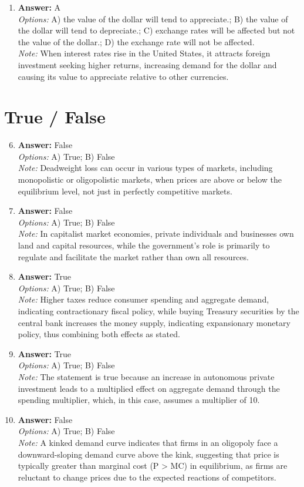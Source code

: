 \documentclass[12pt]{article}
\begin{document}
\begin{enumerate}[label=\arabic*.]
\item \textbf{Answer:} A
\\ \textit{Options:} A) the value of the dollar will tend to appreciate.; B) the value of the dollar will tend to depreciate.; C) exchange rates will be affected but not the value of the dollar.; D) the exchange rate will not be affected.
\\ \textit{Note:} When interest rates rise in the United States, it attracts foreign investment seeking higher returns, increasing demand for the dollar and causing its value to appreciate relative to other currencies.
\end{enumerate}

\section*{True / False}
\begin{enumerate}[label=\arabic*.]
\setcounter{enumi}{5}
\item \textbf{Answer:} False
\\ \textit{Options:} A) True; B) False
\\ \textit{Note:} Deadweight loss can occur in various types of markets, including monopolistic or oligopolistic markets, when prices are above or below the equilibrium level, not just in perfectly competitive markets.
\item \textbf{Answer:} False
\\ \textit{Options:} A) True; B) False
\\ \textit{Note:} In capitalist market economies, private individuals and businesses own land and capital resources, while the government's role is primarily to regulate and facilitate the market rather than own all resources.
\item \textbf{Answer:} True
\\ \textit{Options:} A) True; B) False
\\ \textit{Note:} Higher taxes reduce consumer spending and aggregate demand, indicating contractionary fiscal policy, while buying Treasury securities by the central bank increases the money supply, indicating expansionary monetary policy, thus combining both effects as stated.
\item \textbf{Answer:} True
\\ \textit{Options:} A) True; B) False
\\ \textit{Note:} The statement is true because an increase in autonomous private investment leads to a multiplied effect on aggregate demand through the spending multiplier, which, in this case, assumes a multiplier of 10.
\item \textbf{Answer:} False
\\ \textit{Options:} A) True; B) False
\\ \textit{Note:} A kinked demand curve indicates that firms in an oligopoly face a downward-sloping demand curve above the kink, suggesting that price is typically greater than marginal cost (P \textgreater{} MC) in equilibrium, as firms are reluctant to change prices due to the expected reactions of competitors.
\end{enumerate}
\end{document}
